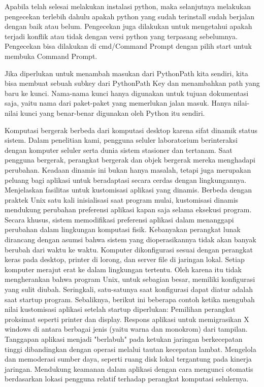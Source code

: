 Apabila telah selesai melakukan instalasi python, maka selanjutnya melakukan pengecekan terlebih dahulu apakah python yang sudah terinstall sudah berjalan dengan baik atau belum. Pengecekan juga dilakukan untuk mengetahui apakah terjadi konflik atau tidak dengan versi python yang terpasang sebelumnya. Pengecekan bisa dilakukan di cmd/Command Prompt dengan pilih start untuk membuka Command Prompt. \cite{mckinney2012python}

Jika diperlukan untuk menambah masukan dari PythonPath kita sendiri, kita bisa membuat sebuah subkey dari PythonPath Key dan menambahkan path yang baru ke kunci. Nama-nama kunci hanya digunakan untuk tujuan dokumentasi saja, yaitu nama dari paket-paket yang memerlukan jalan masuk. Hanya nilai-nilai kunci yang benar-benar digunakan oleh Python itu sendiri. \cite{hammond2000python}

Komputasi bergerak berbeda dari komputasi desktop karena sifat dinamik status sistem. Dalam penelitian kami, pengguna seluler laboratorium berinteraksi dengan komputer seluler serta dunia sistem stasioner dan tertanam. Saat pengguna bergerak, perangkat bergerak dan objek bergerak mereka menghadapi perubahan. Keadaan dinamis ini bukan hanya masalah, tetapi juga merupakan peluang bagi aplikasi untuk beradaptasi secara cerdas dengan lingkungannya.
Menjelaskan fasilitas untuk kustomisasi aplikasi yang dinamis. Berbeda dengan praktek Unix satu kali inisialisasi saat program mulai, kustomisasi dinamis mendukung perubahan preferensi aplikasi kapan saja selama eksekusi program. Secara khusus, sistem memodifikasi preferensi aplikasi dalam menanggapi perubahan dalam lingkungan komputasi fisik.
Kebanyakan perangkat lunak dirancang dengan asumsi bahwa sistem yang dioperasikannya tidak akan banyak berubah dari waktu ke waktu. Komputer dikonfigurasi sesuai dengan perangkat keras pada desktop, printer di lorong, dan server file di jaringan lokal. Setiap komputer merajut erat ke dalam lingkungan tertentu. Oleh karena itu tidak mengherankan bahwa program Unix, untuk sebagian besar, memiliki konfigurasi yang sulit diubah. Seringkali, satu-satunya saat konfigurasi dapat diatur adalah saat startup program.
Sebaliknya, berikut ini beberapa contoh ketika mengubah nilai kustomisasi aplikasi setelah startup diperlukan:
Pemilihan perangkat proksimat seperti printer dan display.
Respons aplikasi untuk memigrasikan X windows di antara berbagai jenis (yaitu warna dan monokrom) dari tampilan.
Tanggapan aplikasi menjadi "berlabuh" pada ketukan jaringan berkecepatan tinggi dibandingkan dengan operasi melalui tautan kecepatan lambat.
Mengelola dan memoderasi sumber daya, seperti ruang disk lokal tergantung pada kinerja jaringan.
Mendukung keamanan dalam aplikasi dengan cara mengunci otomatis berdasarkan lokasi pengguna relatif terhadap perangkat komputasi selulernya.




